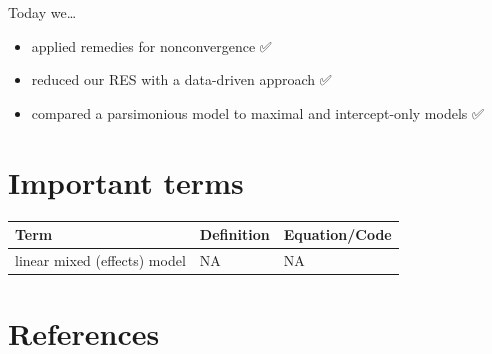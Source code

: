 \documentclass[
  letterpaper,
  DIV=11,
  numbers=noendperiod]{scrartcl}
\providecommand{\tightlist}{%
  \setlength{\itemsep}{0pt}\setlength{\parskip}{0pt}}\usepackage{longtable,booktabs,array}
\begin{document}
Today we\ldots{}

\begin{itemize}
\tightlist
\item
  applied remedies for nonconvergence ✅
\item
  reduced our RES with a data-driven approach ✅
\item
  compared a parsimonious model to maximal and intercept-only models ✅
\end{itemize}

\hypertarget{important-terms}{%
\section*{Important terms}\label{important-terms}}

\begin{longtable*}{lll}
\toprule
Term & Definition & Equation/Code \\ 
\midrule
linear mixed (effects) model & NA & NA \\ 
\bottomrule
\end{longtable*}

\hypertarget{references}{%
\section*{References}\label{references}}
\end{document}
